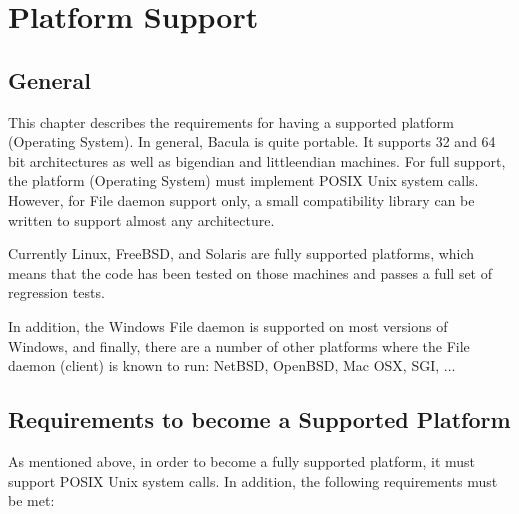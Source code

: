
\chapter{Platform Support}
\label{_PlatformChapter}

\section{General}

This chapter describes the requirements for having a
supported platform (Operating System).  In general, Bacula is
quite portable. It supports 32 and 64 bit architectures as well
as bigendian and littleendian machines. For full
support, the platform (Operating System) must implement POSIX Unix
system calls.  However, for File daemon support only, a small
compatibility library can be written to support almost any
architecture.

Currently Linux, FreeBSD, and Solaris are fully supported
platforms, which means that the code has been tested on those
machines and passes a full set of regression tests.

In addition, the Windows File daemon is supported on most versions
of Windows, and finally, there are a number of other platforms
where the File daemon (client) is known to run: NetBSD, OpenBSD,
Mac OSX, SGI, ...

\section{Requirements to become a Supported Platform}

As mentioned above, in order to become a fully supported platform, it
must support POSIX Unix system calls.  In addition, the following
requirements must be met:

